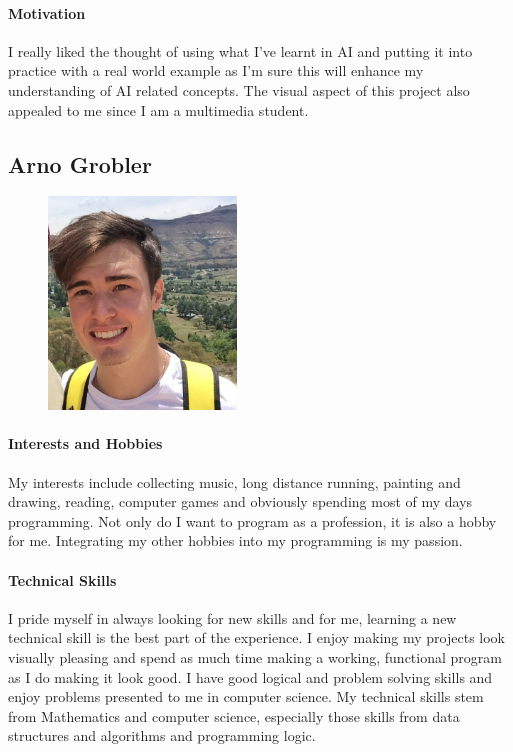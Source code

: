 \documentclass[english]{article}
\begin{document}
			\paragraph{Motivation}
			I really liked the thought of using what I've learnt in AI and putting it into practice with a real world example as I'm sure this will enhance my understanding of AI related concepts. The visual aspect of this project also appealed to me since I am a multimedia student.
		
		\newpage
		\subsection{Arno Grobler}
			\begin{figure}
				\begin{center}
					\includegraphics[width=5cm]{arno.jpg}
				\end{center}
			\end{figure}
			\paragraph{Interests and Hobbies}
			My interests include collecting music, long distance running, painting and drawing, reading, computer games and obviously spending most of my days programming. Not only do I want to program as a profession, it is also a hobby for me. Integrating my other hobbies into my programming is my passion.
			
			\paragraph{Technical Skills}
            I pride myself in always looking for new skills and for me, learning a new technical skill is the best part of the experience. I enjoy making my projects look visually pleasing and spend as much time making a working, functional program as I do making it look good. I have good logical and problem solving skills and enjoy problems presented to me in computer science. My technical skills stem from Mathematics and computer science, especially those skills from data structures and algorithms and programming logic.
			
\end{document}
